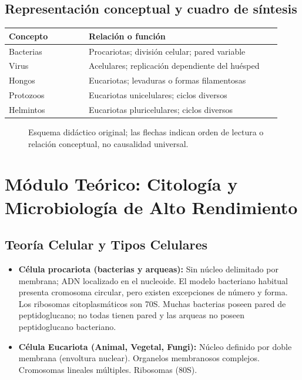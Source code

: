 \subsection{Representación conceptual y cuadro de síntesis}
\begin{longtable}{p{0.27\linewidth}p{0.65\linewidth}}
\toprule Concepto & Relación o función\\\midrule
Bacterias & Procariotas; división celular; pared variable\\
Virus & Acelulares; replicación dependiente del huésped\\
Hongos & Eucariotas; levaduras o formas filamentosas\\
Protozoos & Eucariotas unicelulares; ciclos diversos\\
Helmintos & Eucariotas pluricelulares; ciclos diversos\\
\bottomrule
\end{longtable}
\begin{figure}[htbp]
\centering
{}
\caption{Esquema didáctico original; las flechas indican orden de lectura o relación conceptual, no causalidad universal.}
\end{figure}

\clearpage



\section{Módulo Teórico: Citología y Microbiología de Alto Rendimiento}
\subsection{Teoría Celular y Tipos Celulares}
\begin{itemize}
    \item \textbf{Célula procariota (bacterias y arqueas):} Sin núcleo delimitado por membrana; ADN localizado en el nucleoide. El modelo bacteriano habitual presenta cromosoma circular, pero existen excepciones de número y forma. Los ribosomas citoplasmáticos son 70S. Muchas bacterias poseen pared de peptidoglucano; no todas tienen pared y las arqueas no poseen peptidoglucano bacteriano.
    \item \textbf{Célula Eucariota (Animal, Vegetal, Fungi):} Núcleo definido por doble membrana (envoltura nuclear). Organelos membranosos complejos. Cromosomas lineales múltiples. Ribosomas (80S).
\end{itemize}

